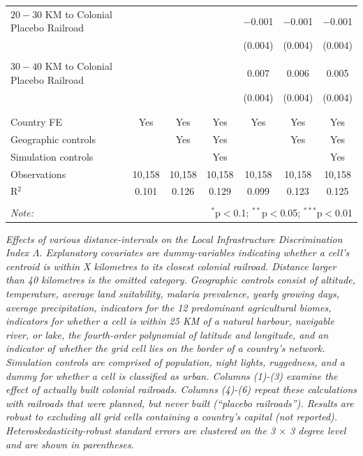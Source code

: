 \documentclass[11pt, oneside]{article}   	%
\newcommand{\mysubcaption}[1]{
\justify
\begin{spacing}{0.7}
\textit{\footnotesize #1}
\end{spacing}}
\begin{document}
\begin{table}[t]
{\begin{tabular}{@{\extracolsep{5pt}}lcccccc}
   $20-30$ KM to Colonial Placebo Railroad &  &  &  & $-$0.001 & $-$0.001 & $-$0.001   \\
  &  &  &  & (0.004) & (0.004) & (0.004)  \\
    & & & & & &   \\
   $30-40$ KM to Colonial Placebo Railroad &  &  &  & 0.007 & 0.006 & 0.005   \\
  &  &  &  & (0.004) & (0.004) & (0.004)   \\
    & & & & & &  \\
  \hline \\[-1.8ex]
  Country FE & Yes & Yes & Yes & Yes & Yes & Yes \\
  Geographic controls &  & Yes & Yes &  & Yes & Yes  \\
  Simulation controls &  &  & Yes &  &  & Yes   \\
  Observations & 10,158 & 10,158 & 10,158 & 10,158 & 10,158 & 10,158   \\
  R$^{2}$ & 0.101 & 0.126 & 0.129 & 0.099 & 0.123 & 0.125   \\
  \hline
  \hline \\[-1.8ex]
  \textit{Note:}  & \multicolumn{6}{r}{$^{*}$p$<$0.1; $^{**}$p$<$0.05; $^{***}$p$<$0.01} \\
  \end{tabular}

}

\mysubcaption{Effects of various distance-intervals on the Local Infrastructure Discrimination Index $\Lambda$. Explanatory covariates are dummy-variables indicating whether a cell's centroid is within X kilometres to its closest colonial railroad. Distance larger than 40 kilometres is the omitted category. Geographic controls consist of altitude, temperature, average land suitability, malaria prevalence, yearly growing days, average precipitation, indicators for the 12 predominant agricultural biomes, indicators for whether a cell is within 25 KM of a natural harbour, navigable river, or lake, the fourth-order polynomial of latitude and longitude, and an indicator of whether the grid cell lies on the border of a country's network. Simulation controls are comprised of population, night lights, ruggedness, and a dummy for whether a cell is classified as urban. Columns (1)-(3) examine the effect of actually built colonial railroads. Columns (4)-(6) repeat these calculations with railroads that were planned, but never built (``placebo railroads''). Results are robust to excluding all grid cells containing a country's capital (not reported). Heteroskedasticity-robust standard errors are clustered on the 3 $\times$ 3 degree level and are shown in parentheses.}
\end{table}
\end{document}
